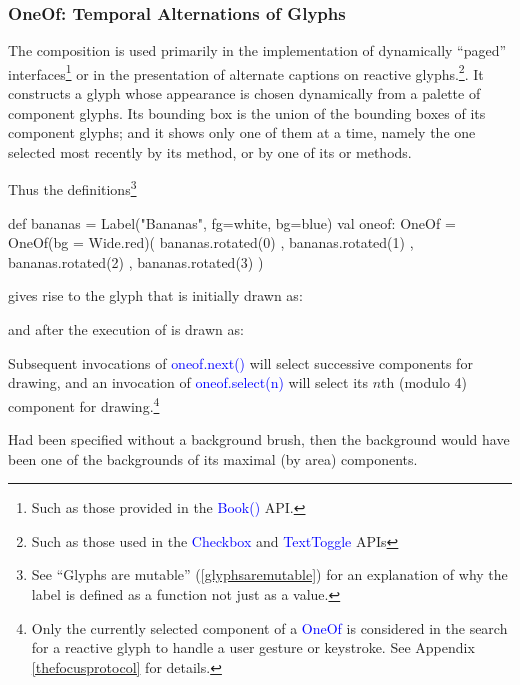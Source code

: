\documentclass[12pt,a4paper]{article}
\def\Scala#1{\textcolor{blue}{\textsf{#1}}}
\def\SSS#1{\subsubsection*{#1}}
\begin{document}
\clearpage
\SSS{OneOf: Temporal Alternations of Glyphs}
The  composition is used primarily in the implementation of
dynamically ``paged'' interfaces\footnote{Such as those provided in
the \Scala{Book()} API.} or in the presentation of
alternate captions on reactive glyphs.\footnote{Such
as those used in the \Scala{Checkbox} and \Scala{TextToggle} APIs}. It constructs a glyph whose appearance is chosen
dynamically from a palette of component glyphs.
Its bounding box is the union of the bounding boxes of its component glyphs;
and it shows only one of them at a time, namely the one selected most recently by  its  method,
or by one of its  or  methods.

Thus the definitions\footnote{See ``Glyphs are mutable'' (\ref {glyphsaremutable}) for an explanation
of why the label is defined as a function not just as a value.}
\begin{scala}
  def bananas = Label("Bananas", fg=white, bg=blue)
  val oneof: OneOf =
      OneOf(bg = Wide.red)( bananas.rotated(0)
                          , bananas.rotated(1)
                          , bananas.rotated(2)
                          , bananas.rotated(3)
                          )
 \end{scala}
gives rise to the glyph that is initially drawn as:
\begin{center}
\end{center}

and after the execution of  is drawn as:
\begin{center}
\end{center}

Subsequent invocations of \Scala{oneof.next()} will select successive components
for drawing, and an invocation of \Scala{oneof.select(n)} will select its $n$th (modulo 4)
component for drawing.\footnote{Only the currently selected component of a
\Scala{OneOf} is considered in the search for a reactive glyph to handle
a user gesture or keystroke. See Appendix \ref{thefocusprotocol} for details.} 

Had  been specified without a background brush, then
the background would have been one of the backgrounds of its
maximal (by area) components.
\begin{center}
\end{center}
\end{document}
